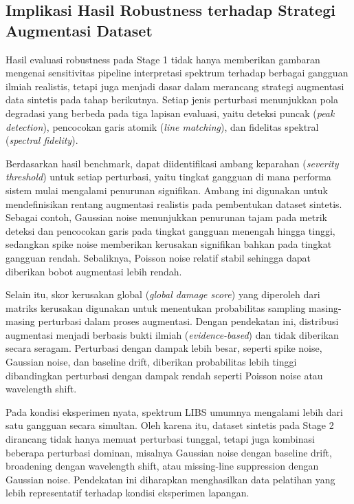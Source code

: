 \subsection{Implikasi Hasil Robustness terhadap Strategi Augmentasi Dataset}

Hasil evaluasi robustness pada Stage 1 tidak hanya memberikan gambaran mengenai sensitivitas pipeline interpretasi spektrum terhadap berbagai gangguan ilmiah realistis, tetapi juga menjadi dasar dalam merancang strategi augmentasi data sintetis pada tahap berikutnya. Setiap jenis perturbasi menunjukkan pola degradasi yang berbeda pada tiga lapisan evaluasi, yaitu deteksi puncak (\textit{peak detection}), pencocokan garis atomik (\textit{line matching}), dan fidelitas spektral (\textit{spectral fidelity}).

Berdasarkan hasil benchmark, dapat diidentifikasi ambang keparahan (\textit{severity threshold}) untuk setiap perturbasi, yaitu tingkat gangguan di mana performa sistem mulai mengalami penurunan signifikan. Ambang ini digunakan untuk mendefinisikan rentang augmentasi realistis pada pembentukan dataset sintetis. Sebagai contoh, Gaussian noise menunjukkan penurunan tajam pada metrik deteksi dan pencocokan garis pada tingkat gangguan menengah hingga tinggi, sedangkan spike noise memberikan kerusakan signifikan bahkan pada tingkat gangguan rendah. Sebaliknya, Poisson noise relatif stabil sehingga dapat diberikan bobot augmentasi lebih rendah.

Selain itu, skor kerusakan global (\textit{global damage score}) yang diperoleh dari matriks kerusakan digunakan untuk menentukan probabilitas sampling masing-masing perturbasi dalam proses augmentasi. Dengan pendekatan ini, distribusi augmentasi menjadi berbasis bukti ilmiah (\textit{evidence-based}) dan tidak diberikan secara seragam. Perturbasi dengan dampak lebih besar, seperti spike noise, Gaussian noise, dan baseline drift, diberikan probabilitas lebih tinggi dibandingkan perturbasi dengan dampak rendah seperti Poisson noise atau wavelength shift.

Pada kondisi eksperimen nyata, spektrum LIBS umumnya mengalami lebih dari satu gangguan secara simultan. Oleh karena itu, dataset sintetis pada Stage 2 dirancang tidak hanya memuat perturbasi tunggal, tetapi juga kombinasi beberapa perturbasi dominan, misalnya Gaussian noise dengan baseline drift, broadening dengan wavelength shift, atau missing-line suppression dengan Gaussian noise. Pendekatan ini diharapkan menghasilkan data pelatihan yang lebih representatif terhadap kondisi eksperimen lapangan.

